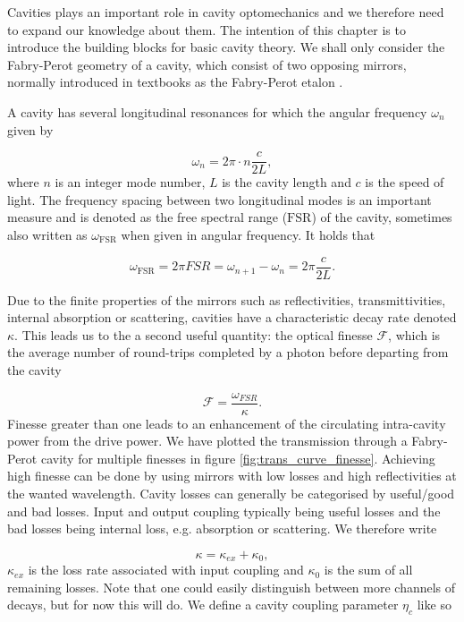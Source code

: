 Cavities plays an important role in cavity optomechanics and we therefore need to expand our knowledge about them. The intention of this chapter is to introduce the building blocks for basic cavity theory. We shall only consider the Fabry-Perot geometry of a cavity, which consist of two opposing mirrors, normally introduced in textbooks as the Fabry-Perot etalon \cite{milonni2010}.

A cavity has several longitudinal resonances for which the angular frequency $\omega_n$ given by

\begin{equation}
\omega_n = 2\pi\cdot n\frac{c}{2L}, 
\end{equation}
\noindent
where $n$ is an integer mode number, $L$ is the cavity length and $c$ is the speed of light. The frequency spacing between two longitudinal modes is an important measure and is denoted as the free spectral range ($\mathrm{FSR}$) of the cavity, sometimes also written as $\omega_{\mathrm{FSR}}$ when given in angular frequency. It holds that

\begin{equation}
\omega_{\mathrm{FSR}} = 2\pi FSR  = \omega_{n+1} - \omega_n = 2\pi\frac{c}{2L}.
\end{equation}

Due to the finite properties of the mirrors such as reflectivities, transmittivities, internal absorption or scattering, cavities have a characteristic decay rate denoted $\kappa$. This leads us to the a second  useful quantity: the optical finesse $\mathcal{F}$, which is the average number of round-trips completed by a photon before departing from the cavity

\begin{equation}
\mathcal{F} = \frac{\omega_{FSR}}{\kappa}.
\end{equation}
\noindent
Finesse greater than one leads to an enhancement of the circulating intra-cavity power from the drive power. We have plotted the transmission through a Fabry-Perot cavity for multiple finesses in figure \ref{fig:trans_curve_finesse}. Achieving high finesse can be done by using mirrors with low losses and high reflectivities at the wanted wavelength. Cavity losses can generally be categorised by useful/good and bad losses. Input and output coupling typically being useful losses and the bad losses being internal loss, e.g. absorption or scattering. We therefore write

\begin{equation}
\kappa = \kappa_{ex} + \kappa_{0},
\end{equation}
\noindent
$\kappa_{ex}$ is the loss rate associated with input coupling and $\kappa_0$ is the sum of all remaining losses. Note that one could easily distinguish between more channels of decays, but for now this will do. We define a cavity coupling parameter $\eta_c$ like so

